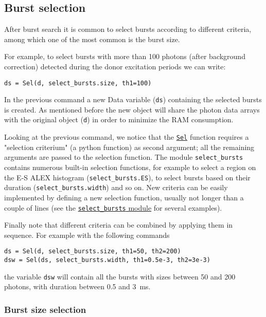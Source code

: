 \subsection{Burst selection}
\label{sec:burstsel}

After burst search it is common to select bursts according to different criteria, among which one of the most common is the burst size.

For example, to select bursts with more than 100 photons (after background correction) detected during the donor excitation periods we can write:

\begin{verbatim}
ds = Sel(d, select_bursts.size, th1=100)
\end{verbatim}

In the previous command a new Data variable (\verb|ds|) containing the selected bursts is created. As mentioned before the new object will share the photon data arrays with the original object (\verb|d|) in order to minimize the RAM consumption.

Looking at the previous command, we notice that the \href{http://fretbursts.readthedocs.org/en/latest/burst_selection.html#fretbursts.burstlib.Sel}{\verb|Sel|} function requires a "selection criterium" (a python function) as second argument; all the remaining arguments are passed to the selection function. The module \verb|select_bursts| contains numerous built-in selection functions, for example to
select a region on the E-S ALEX histogram (\verb|select_bursts.ES|), 
to select bursts based on their duration (\verb|select_bursts.width|) and so on. New criteria can be easily 
implemented by defining a new selection function, usually not longer than a couple of lines (see the \href{https://github.com/tritemio/FRETBursts/blob/master/fretbursts/select_bursts.py}{\verb|select_bursts| module} for several examples).

Finally note that different criteria can be combined by applying them
in sequence. For example with the following commands

\begin{verbatim}
ds = Sel(d, select_bursts.size, th1=50, th2=200)
dsw = Sel(ds, select_bursts.width, th1=0.5e-3, th2=3e-3)
\end{verbatim}

the variable \verb|dsw| will contain all the bursts with sizes between 50 and 200 photons, with duration between 0.5 and 3~ms.

\subsubsection{Burst size selection}

